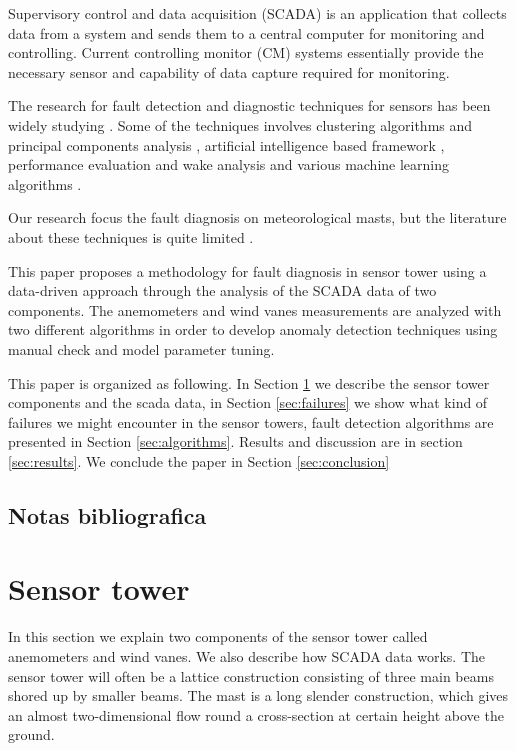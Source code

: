 \documentclass[journal]{IEEEtran}
\begin{document}
Supervisory control and data acquisition (SCADA) is an application that collects data from a system and sends them to a central computer for monitoring and controlling. Current controlling monitor (CM) systems essentially provide the necessary sensor and capability of data capture required for monitoring.

The research for fault detection and diagnostic techniques for sensors has been widely studying  \cite{tchakoua2014wind,wymore2015survey}. Some of the techniques involves
clustering algorithms and principal components analysis \cite{kim2011use}, artificial intelligence based framework \cite{wang2014scada}, performance evaluation and wake analysis \cite{astolfi2016mathematical} and various machine learning algorithms  \cite{kusiak2011prediction}.

Our research focus the fault diagnosis on meteorological masts,   
but the literature about these techniques is quite limited \cite{hasu2006weather} .

This paper proposes a methodology for fault diagnosis in sensor tower using a data-driven approach through the analysis of the SCADA data of two components. The anemometers and wind vanes measurements are analyzed with two different algorithms in order to develop anomaly detection techniques using manual check and model parameter tuning. 

This paper is organized as following. In Section \ref{sec:sensortower} we describe the sensor tower components and the scada data, in Section \ref{sec:failures} we show what kind of failures we might encounter in the sensor towers, fault detection algorithms are presented in Section \ref{sec:algorithms}. Results and discussion are in section \ref{sec:results}. We conclude the paper in Section \ref{sec:conclusion}


\subsection{Notas bibliografica}

\cite{lu2009review}

\cite{schlechtingen2012condition}

\cite{schlechtingen2011comparative}

\cite{yang2014wind}




\section{Sensor tower}\label{sec:sensortower}
In this section we explain two components of the sensor tower called anemometers and wind vanes.  We also describe how SCADA data works.
The sensor tower will often be a lattice construction consisting of three main beams shored up by smaller beams. The mast is a long slender construction, which gives an almost two-dimensional flow round a cross-section at certain height above the ground. 
\end{document}
